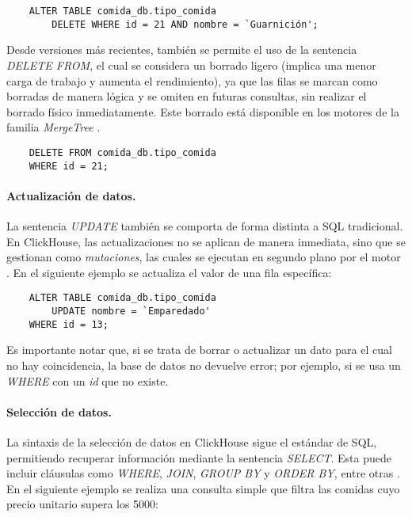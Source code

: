 \begin{verbatim}
    ALTER TABLE comida_db.tipo_comida 
        DELETE WHERE id = 21 AND nombre = `Guarnición';
\end{verbatim}
Desde versiones más recientes, también se permite el uso de la sentencia \emph{DELETE FROM}, el cual se considera un borrado ligero (implica una menor carga de trabajo y aumenta el rendimiento), ya que las filas se marcan como borradas de manera lógica y se omiten en futuras consultas, sin realizar el borrado físico inmediatamente. Este borrado está disponible en los motores de la familia \emph{MergeTree} \parencite{clickhouse_sql_reference}. 

\begin{verbatim}
    DELETE FROM comida_db.tipo_comida
    WHERE id = 21; 
\end{verbatim}



\paragraph{Actualización de datos.} La sentencia \emph{UPDATE} también se comporta de forma distinta a SQL tradicional. En ClickHouse, las actualizaciones no se aplican de manera inmediata, sino que se gestionan como \emph{mutaciones}, las cuales se ejecutan en segundo plano por el motor \parencite{clickhouse_sql_reference}. En el siguiente ejemplo se actualiza el valor de una fila específica:

\begin{verbatim} 
    ALTER TABLE comida_db.tipo_comida 
        UPDATE nombre = `Emparedado' 
    WHERE id = 13; 
\end{verbatim}

Es importante notar que, si se trata de borrar o actualizar un dato para el cual no hay coincidencia, la base de datos no devuelve error; por ejemplo, si se usa un \emph{WHERE} con un \emph{id} que no existe.

\paragraph{Selección de datos.} 
La sintaxis de la selección de datos en ClickHouse sigue el estándar de SQL, permitiendo recuperar información mediante la sentencia \emph{SELECT}. Esta puede incluir cláusulas como \emph{WHERE}, \emph{JOIN}, \emph{GROUP BY} y \emph{ORDER BY}, entre otras \parencite{clickhouse_sql_reference}. En el siguiente ejemplo se realiza una consulta simple que filtra las comidas cuyo precio unitario supera los 5000:

